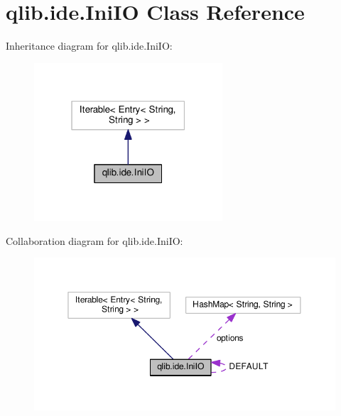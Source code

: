 \hypertarget{classqlib_1_1ide_1_1IniIO}{}\section{qlib.\+ide.\+Ini\+IO Class Reference}
\label{classqlib_1_1ide_1_1IniIO}


Inheritance diagram for qlib.\+ide.\+Ini\+IO\+:\nopagebreak
\begin{figure}[H]
\begin{center}
\leavevmode
\includegraphics[width=199pt]{classqlib_1_1ide_1_1IniIO__inherit__graph}
\end{center}
\end{figure}


Collaboration diagram for qlib.\+ide.\+Ini\+IO\+:\nopagebreak
\begin{figure}[H]
\begin{center}
\leavevmode
\includegraphics[width=350pt]{classqlib_1_1ide_1_1IniIO__coll__graph}
\end{center}
\end{figure}
